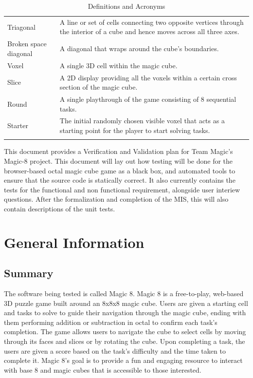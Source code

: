 \documentclass[12pt, titlepage]{article}
\renewcommand{\wss}[1]{}
\begin{document}
\begin{longtable}{p{} p{}}
Triagonal & A line or set of cells connecting two opposite vertices through the interior of a cube and hence moves across all three axes. \\
Broken space diagonal & A diagonal that wraps around the cube's boundaries.\\
Voxel & A single 3D cell within the magic cube. \\
Slice & A 2D display providing all the voxels within a certain cross section of the magic cube.\\
Round & A single playthrough of the game consisting of 8 sequential tasks. \\
Starter & The initial randomly chosen visible voxel that acts as a starting point for the player to start solving tasks.\\
\bottomrule
\caption{Definitions and Acronyms} \label{tab:DefinitionsAndAcronyms}
\end{longtable}


\newpage


This document provides a Verification and Validation plan for Team Magic's Magic-8 project. This document will lay out how testing will be done for the browser-based 
octal magic cube game as a black box, and automated tools to ensure that the source code is statically correct. It also currently contains the tests for the functional
and non functional requirement, alongside user interiew questions. After the formalization and completion of the MIS, this will also contain descriptions of the unit tests.

\section{General Information}

\subsection{Summary}

\wss{Say what software is being tested.  Give its name and a brief overview of
  its general functions.}

  The software being tested is called Magic 8. Magic 8 is a free-to-play, web-based 3D puzzle game built around an 8x8x8 magic cube.
Users are given a starting cell and tasks to solve to guide their navigation through the magic cube, ending with them performing addition or subtraction in octal to confirm each task's completion.
The game allows users to navigate the cube to select cells by moving through its faces and slices or by rotating the cube. Upon completing a task, the users
are given a score based on the task's difficulty and the time taken to complete it. Magic 8's goal is to provide a fun and engaging resource to interact with base 8 and magic cubes that is accessible to those interested.
  
\end{document}
